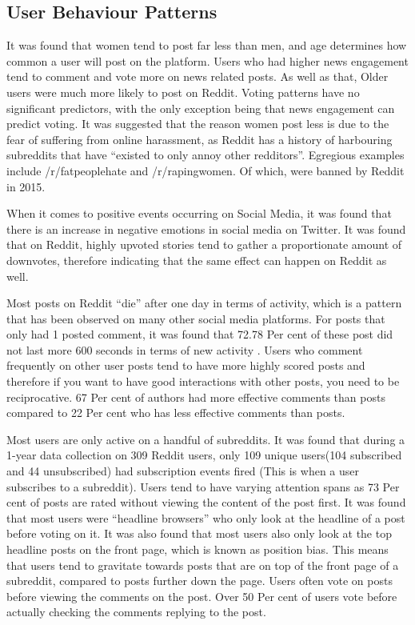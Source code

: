\subsection{User Behaviour Patterns}
It was found that women tend to post far less than men, and age determines how common a user will post on the platform. Users who had higher news engagement tend to comment and vote more on news related posts. As well as that, Older users were much more likely to post on Reddit.  Voting patterns have no significant predictors, with the only exception being that news engagement can predict voting. It was suggested that the reason women post less is due to the fear of suffering from online harassment, as Reddit has a history of harbouring subreddits that have “existed to only annoy other redditors”. Egregious examples include /r/fatpeoplehate and /r/rapingwomen. Of which, were banned by Reddit in 2015. \cite{4}

When it comes to positive events occurring on Social Media, it was found that there is an increase in negative emotions in social media on Twitter. It was found that on Reddit, highly upvoted stories tend to gather a proportionate amount of downvotes, therefore indicating that the same effect can happen on Reddit as well.\cite{3}

Most posts on Reddit “die” after one day in terms of activity, which is a pattern that has been observed on many other social media platforms. For posts that only had 1 posted comment, it was found that 72.78 Per cent of these post did not last more  600 seconds in terms of new activity \cite{7}. Users who comment frequently on other user posts tend to have more highly scored posts and therefore if you want to have good interactions with other posts, you need to be reciprocative. 67 Per cent of authors had more effective comments than posts compared to 22 Per cent who has less effective comments than posts.

Most users are only active on a handful of subreddits. It was found that during a 1-year data collection on 309 Reddit users, only 109 unique users(104 subscribed and 44 unsubscribed) had subscription events fired (This is when a user subscribes to a subreddit). Users tend to have varying attention spans as 73 Per cent of posts are rated without viewing the content of the post first. It was found that most users were “headline browsers” who only look at the headline of a post before voting on it. It was also found that most users also only look at the top headline posts on the front page, which is known as position bias. This means that users tend to gravitate towards posts that are on top of the front page of a subreddit, compared to posts further down the page. Users often vote on posts before viewing the comments on the post. Over 50 Per cent of users vote before actually checking the comments replying to the post. \cite{8}

